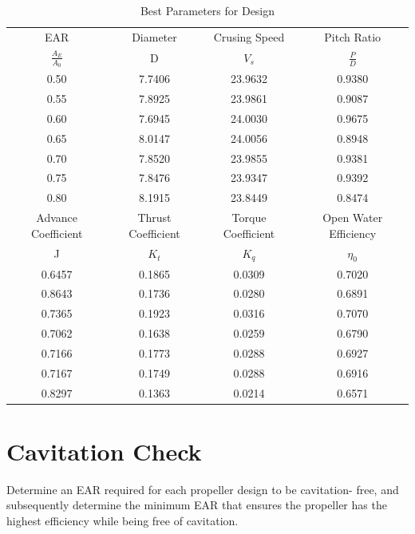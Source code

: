 \documentclass[a4paper,UTF8]{article}
\begin{document}
\begin{table}[!htbp]
	\centering

	\begin{tabular}{cccc}
		\hline
		EAR & Diameter & Crusing Speed & Pitch Ratio \\
$\frac{A_E}{A_0}$     &   D    &   $V_s$    & $\frac{P}{D}$ \\
\hline
0.50  & 7.7406  & 23.9632  & 0.9380  \\
0.55  & 7.8925  & 23.9861  & 0.9087  \\
0.60  & 7.6945  & 24.0030  & 0.9675  \\
0.65  & 8.0147  & 24.0056  & 0.8948  \\
0.70  & 7.8520  & 23.9855  & 0.9381  \\
0.75  & 7.8476  & 23.9347  & 0.9392  \\
0.80  & 8.1915  & 23.8449  & 0.8474  \\
\hline
Advance Coefficient&Thrust Coefficient&Torque Coefficient&Open Water Efficiency \\
J&$K_t$&$K_q$&$\eta_0$\\
\hline
0.6457  & 0.1865  & 0.0309  & 0.7020  \\
0.8643  & 0.1736  & 0.0280  & 0.6891  \\
0.7365  & 0.1923  & 0.0316  & 0.7070  \\
0.7062  & 0.1638  & 0.0259  & 0.6790  \\
0.7166  & 0.1773  & 0.0288  & 0.6927  \\
0.7167  & 0.1749  & 0.0288  & 0.6916  \\
0.8297  & 0.1363  & 0.0214  & 0.6571  \\
		\hline
	\end{tabular}%
	\caption{Best Parameters for Design}
	\label{tab:fact}%
\end{table}%

\section{Cavitation Check}
Determine an EAR required for each propeller design to be cavitation-
free, and subsequently determine the minimum EAR that ensures the
propeller has the highest efficiency while being free of cavitation. 
\end{document}
